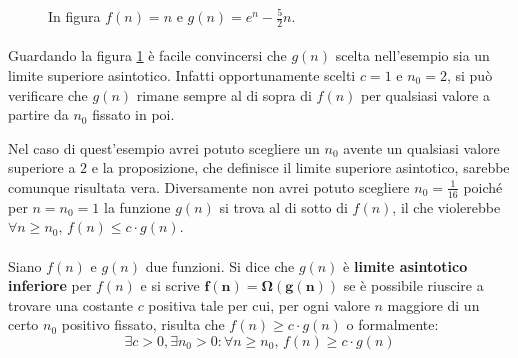 \documentclass[11pt,a4paper,oneside]{article}
\begin{document}
\begin{figure}[hb]
\centering
{}
\caption{In figura $f(n) = n$ e $g(n) = e^n-\frac{5}{2}n$.}
\label{fig:asymsup}
\end{figure}

\paragraph*{}Guardando la figura \ref{fig:asymsup} è facile convincersi che $g(n)$ scelta nell'esempio sia un limite superiore asintotico. Infatti opportunamente scelti $c = 1$ e $n_0 = 2$, si può verificare che $g(n)$ rimane sempre al di sopra di $f(n)$ per qualsiasi valore a partire da $n_0$ fissato in poi.\\

\begin{tcolorbox}[title=Nota bene]
	Nel caso di quest'esempio avrei potuto scegliere un $n_0$ avente un qualsiasi valore superiore a $2$ e la proposizione, che definisce il limite superiore asintotico, sarebbe comunque risultata vera. Diversamente non avrei potuto scegliere $n_0 = \frac{1}{16}$ poiché per $n = n_0 = 1$ la funzione $g(n)$ si trova al di sotto di $f(n)$, il che violerebbe $\forall n \geq n_0,\,f(n) \leq c\cdot g(n)$.
\end{tcolorbox}
\pagebreak
\paragraph{} Siano $f(n)$ e $g(n)$ due funzioni. Si dice che $g(n)$ è \textbf{limite asintotico inferiore} per $f(n)$ e si scrive $\bm{f(n) = \Omega(g(n))}$ se è possibile riuscire a trovare una costante $c$ positiva tale per cui, per ogni valore $n$ maggiore di un certo $n_0$ positivo fissato, risulta che $f(n) \geq  c\cdot g(n)$ o formalmente: $$\exists c>0, \exists n_0 > 0 : \forall n \geq n_0,\,f(n) \geq c\cdot g(n)$$
\end{document}
